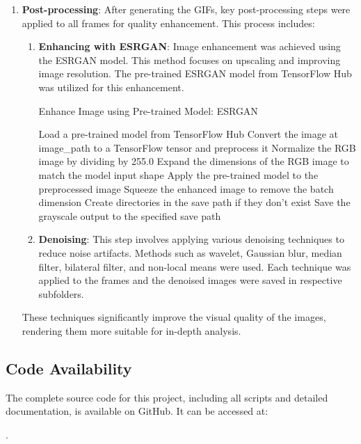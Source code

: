 \begin{enumerate}
    \item \textbf{Post-processing}:
    After generating the GIFs, key post-processing steps were applied to all frames for quality enhancement. This process includes:
    
    \begin{enumerate}
        \item \textbf{Enhancing with ESRGAN}: Image enhancement was achieved using the ESRGAN model. This method focuses on upscaling and improving image resolution. The pre-trained ESRGAN model from TensorFlow Hub was utilized for this enhancement.

        \vspace{10pt}
        

        \begin{algorithm}
            \caption{Enhance Image using Pre-trained Model: ESRGAN}
            \begin{algorithmic}[1]
                
                \STATE Load a pre-trained model from TensorFlow Hub
                \STATE Convert the image at image\_path to a TensorFlow tensor and preprocess it
                \STATE Normalize the RGB image by dividing by 255.0
                \STATE Expand the dimensions of the RGB image to match the model input shape
                \STATE Apply the pre-trained model to the preprocessed image
                \STATE Squeeze the enhanced image to remove the batch dimension
                \STATE Create directories in the save path if they don't exist
                \STATE Save the grayscale output to the specified save path

            \end{algorithmic}
        \end{algorithm}

        
        
        
        \item \textbf{Denoising}: This step involves applying various denoising techniques to reduce noise artifacts. Methods such as wavelet, Gaussian blur, median filter, bilateral filter, and non-local means were used. Each technique was applied to the frames and the denoised images were saved in respective subfolders.


        
    
    \end{enumerate}
    
    These techniques significantly improve the visual quality of the images, rendering them more suitable for in-depth analysis.
    
    
        
\end{enumerate}


\subsection{Code Availability}
The complete source code for this project, including all scripts and detailed documentation, is available on GitHub. It can be accessed at: 

\href{https://github.com/Mithunjack/Thesis-NeRFs}{\color{blue}{https://github.com/Mithunjack/Thesis-NeRFs}}.


